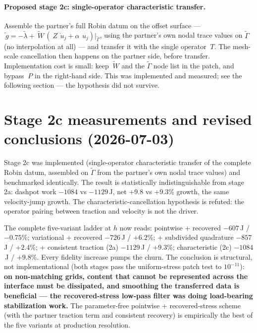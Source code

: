 \documentclass[11pt]{article}
\begin{document}
\paragraph{Proposed stage 2c: single-operator characteristic
transfer.}  Assemble the partner's full Robin datum on the offset
surface --- $\tilde{~g} = -\tilde{\lambda} + \tilde{~W}\,
(~Z\,\dot{~u}_j + \alpha\,~u_j)\big|_{\tilde\Gamma}$, using the
partner's own nodal trace values on $\tilde\Gamma$ (no interpolation
at all) --- and transfer it with the single operator $~T$.  The
mesh-scale cancellation then happens on the partner side, before
transfer.  Implementation cost is small: keep $\tilde{~W}$ and the
$\tilde\Gamma$ node list in the patch, and bypass $~P$ in the
right-hand side.  This was implemented and measured; see the
following section --- the hypothesis did not survive.

\section{Stage 2c measurements and revised conclusions (2026-07-03)}

Stage 2c was implemented (single-operator characteristic transfer of
the complete Robin datum, assembled on $\tilde\Gamma$ from the
partner's own nodal trace values) and benchmarked identically.  The
result is statistically indistinguishable from stage 2a: dashpot work
$-1084$ vs $-1129$\,J, net $+9.8$ vs $+9.3$\% growth, the same
velocity-jump growth.  The characteristic-cancellation hypothesis is
refuted: the operator pairing between traction and velocity is not the
driver.

The complete five-variant ladder at $h$ now reads: pointwise +
recovered $-607$\,J / $-0.75$\%; variational + recovered $-726$\,J /
$+6.2$\%; + subdivided quadrature $-857$\,J / $+2.4$\%; + consistent
traction (2a) $-1129$\,J / $+9.3$\%; characteristic (2c) $-1084$\,J /
$+9.8$\%.  Every fidelity increase pumps the churn.  The conclusion is
structural, not implementational (both stages pass the uniform-stress
patch test to $10^{-11}$): \textbf{on non-matching grids, content that
cannot be represented across the interface must be dissipated, and
smoothing the transferred data is beneficial --- the recovered-stress
low-pass filter was doing load-bearing stabilization work.}  The
parameter-free pointwise + recovered-stress scheme (with the partner
traction term and consistent recovery) is empirically the best of the
five variants at production resolution.
\end{document}

